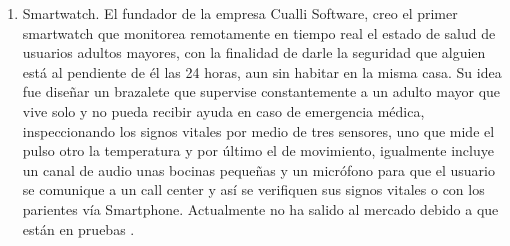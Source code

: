 \begin{enumerate}
	\item Smartwatch.
	El fundador de la empresa Cualli Software, creo el primer smartwatch que monitorea remotamente en tiempo real el estado de salud de usuarios adultos mayores, con la finalidad de darle la seguridad que alguien está al pendiente de él las 24 horas, aun sin habitar en la misma casa. Su idea fue diseñar un brazalete que supervise constantemente a un adulto mayor que vive solo y no pueda recibir ayuda en caso de emergencia médica, inspeccionando los signos vitales por medio de tres sensores, uno que mide el pulso otro la temperatura y por último el de movimiento, igualmente incluye un canal de audio unas bocinas pequeñas y un micrófono para que el usuario se comunique a un call center y así se verifiquen sus signos vitales o con los parientes vía Smartphone. Actualmente no ha salido al mercado debido a que están en pruebas \cite{treintaynueve}.
	

\end{enumerate}
